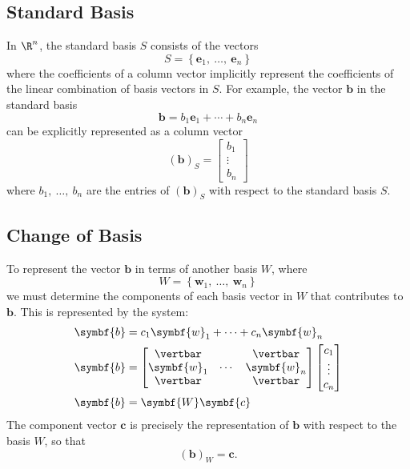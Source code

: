 \documentclass{article}
\begin{document}
\subsection{Standard Basis}
In \(\R^n\), the standard basis \(S\) consists of the vectors
\begin{equation*}
    S = \left\{ \symbf{e}_1,\: \dots,\: \symbf{e}_n \right\}
\end{equation*}
where the coefficients of a column vector implicitly represent the coefficients
of the linear \linebreak combination of basis vectors in \(S\).
For example, the vector \(\symbf{b}\) in the standard basis
\begin{equation*}
    \symbf{b} = b_1 \symbf{e}_1 + \cdots + b_n \symbf{e}_n
\end{equation*}
can be explicitly represented as a column vector
\begin{equation*}
    \left( \symbf{b} \right)_S =
    \begin{bmatrix}
        b_1    \\
        \vdots \\
        b_n
    \end{bmatrix}
\end{equation*}
where \(b_1,\: \dots,\: b_n\) are the entries of \(\left( \symbf{b} \right)_S\) with respect to the standard basis \(S\).
\subsection{Change of Basis}
To represent the vector \(\symbf{b}\) in terms of another basis \(W\),
where
\begin{equation*}
    W = \left\{ \symbf{w}_1,\: \dots,\: \symbf{w}_n \right\}
\end{equation*}
we must determine the components of each basis vector in \(W\) that
contributes to \(\symbf{b}\). This is represented by the system:
\begin{align*}
    \symbf{b} & = c_1 \symbf{w}_1 + \cdots + c_n \symbf{w}_n \\
    \symbf{b} & =
    \begin{bmatrix}
        \vertbar    &        & \vertbar    \\
        \symbf{w}_1 & \cdots & \symbf{w}_n \\
        \vertbar    &        & \vertbar
    \end{bmatrix}
    \begin{bmatrix}
        c_1    \\
        \vdots \\
        c_n
    \end{bmatrix}
    \\
    \symbf{b} & = \symbf{W} \symbf{c}
\end{align*}
The component vector \(\symbf{c}\) is precisely the representation of \(\symbf{b}\)
with respect to the basis \(W\), so that
\begin{equation*}
    \left( \symbf{b} \right)_W = \symbf{c}.
\end{equation*}
\end{document}

